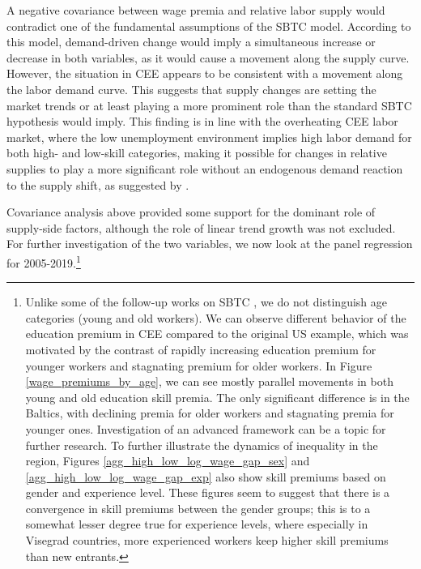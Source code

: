 \documentclass[11pt]{article}
\begin{document}
A negative covariance between wage premia and relative labor supply would contradict one of the fundamental assumptions of the SBTC model. According to this model, demand-driven change would imply a simultaneous increase or decrease in both variables, as it would cause a movement along the supply curve. However, the situation in CEE appears to be consistent with a movement along the labor demand curve. This suggests that supply changes are setting the market trends or at least playing a more prominent role than the standard SBTC hypothesis would imply. This finding is in line with the overheating CEE labor market, where the low unemployment environment implies high labor demand for both high- and low-skill categories, making it possible for changes in relative supplies to play a more significant role without an endogenous demand reaction to the supply shift, as suggested by \citep{acemoglu2002directed}. %



Covariance analysis above provided some support for the dominant role of supply-side factors, although the role of linear trend growth was not excluded. For further investigation of the two variables, we now look at the panel regression for 2005-2019.\footnote{Unlike some of the follow-up works on SBTC \citep{card2001can}, we do not distinguish age categories (young and old workers). We can observe different behavior of the education premium in CEE compared to the original US example, which was motivated by the contrast of rapidly increasing education premium for younger workers and stagnating premium for older workers. In Figure \ref{wage_premiums_by_age}, we can see mostly parallel movements in both young and old education skill premia. The only significant difference is in the Baltics, with declining premia for older workers and stagnating premia for younger ones. Investigation of an advanced framework can be a topic for further research. To further illustrate the dynamics of inequality in the region, Figures \ref{agg_high_low_log_wage_gap_sex} and \ref{agg_high_low_log_wage_gap_exp} also show skill premiums based on gender and experience level. These figures seem to suggest that there is a convergence in skill premiums between the gender groups; this is to a somewhat lesser degree true for experience levels, where especially in Visegrad countries, more experienced workers keep higher skill premiums than new entrants.}   %
\end{document}
